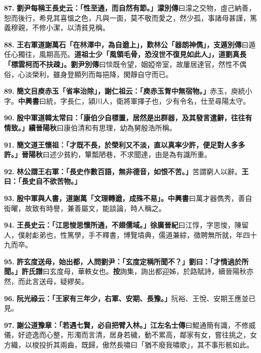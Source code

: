 \textbf{87.} \textbf{劉尹每稱王長史云：「性至通，而自然有節。」}{\footnotesize \textbf{濛別傳}曰濛之交物，虛己納善，恕而後行，希見其喜慍之色，凡與一面，莫不敬而愛之，然少孤，事諸母甚謹，篤義穆親，不修小潔，以清貧見稱。}

\textbf{88.} \textbf{王右軍道謝萬石「在林澤中，為自遒上」，歎林公「器朗神儁」，}{\footnotesize \textbf{支遁別傳}曰遁任心獨往，風期高亮。}\textbf{道祖士少「風領毛骨，恐沒世不復見如此人」，道劉真長「標雲柯而不扶疎」。}{\footnotesize \textbf{劉尹別傳}曰惔既令望，姻婭帝室，故屢居達官，然性不偶俗，心淡榮利，雖身登顯列而每挹降，閑靜自守而已。}

\textbf{89.} \textbf{簡文目庾赤玉「省率治除」，謝仁祖云：「庾赤玉胷中無宿物。」}{\footnotesize 赤玉，庾統小字。\textbf{中興書}曰統，字長仁，潁川人，衛將軍擇子也，少有令名，仕至尋陽太守。}

\textbf{90.} \textbf{殷中軍道韓太常曰：「康伯少自標置，居然是出群器，及其發言遣辭，往往有情致。」}{\footnotesize \textbf{續晉陽秋}曰康伯清和有思理，幼為舅殷浩所稱。}

\textbf{91.} \textbf{簡文道王懷祖：「才既不長，於榮利又不淡，直以真率少許，便足對人多多許。」}{\footnotesize \textbf{晉陽秋}曰述少貧約，簞瓢陋巷，不求聞達，由是為有識所重。}

\textbf{92.} \textbf{林公謂王右軍：「長史作數百語，無非德音，如恨不苦。」}{\footnotesize 苦謂窮人以辭。}\textbf{王曰：「長史自不欲苦物。」}

\textbf{93.} \textbf{殷中軍與人書，道謝萬「文理轉遒，成殊不易」。}{\footnotesize \textbf{中興書}曰萬才器儁秀，善自衒曜，故致有時譽，兼善屬文，能談論，時人稱之。}

\textbf{94.} \textbf{王長史云：「江思悛思懷所通，不翅儒域。」}{\footnotesize \textbf{徐廣晉紀}曰江惇，字思悛，陳留人，僕射虨弟也，性篤學，手不釋書，博覽墳典，儒道兼綜，徵聘無所就，年四十九而卒。}

\textbf{95.} \textbf{許玄度送母，始出都，人問劉尹：「玄度定稱所聞不？」劉曰：「才情過於所聞。」}{\footnotesize \textbf{許氏譜}曰玄度母，華軼女也。\textbf{按}詢集，詢出都迎姊，於路賦詩，續晉陽秋亦然，而此言送母，疑繆矣。}

\textbf{96.} \textbf{阮光祿云：「王家有三年少，右軍、安期、長豫。」}{\footnotesize 阮裕、王悅、安期王應並已見。}

\textbf{97.} \textbf{謝公道豫章：「若遇七賢，必自把臂入林。」}{\footnotesize \textbf{江左名士傳}曰鯤通簡有識，不修威儀，好迹逸而心整，形濁而言清，居身若穢，動不累高，鄰家有女，嘗往挑之，女方織，以梭投折其兩齒，既歸，傲然長嘯曰「猶不廢我嘯歌」，其不事形骸如此。}

